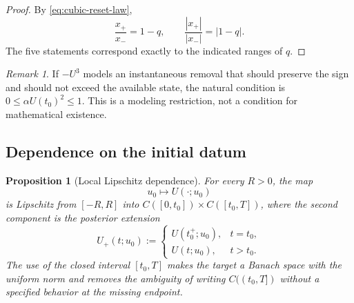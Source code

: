 \documentclass[preprint,12pt]{elsarticle}
\newenvironment{revision}{\begingroup\color{red}}{\endgroup}
\newenvironment{revision}{}{}
\newtheorem{proposition}[theorem]{Proposition}
\theoremstyle{definition}
\theoremstyle{remark}
\newtheorem{remark}[theorem]{Remark}
\begin{document}
\begin{proof}
By \eqref{eq:cubic-reset-law},
\[
 \frac{x_+}{x_-}=1-q,
 \qquad
 \frac{|x_+|}{|x_-|}=|1-q|.
\]
The five statements correspond exactly to the indicated ranges of $q$.
\end{proof}

\begin{remark}
If $-U^3$ models an instantaneous removal that should preserve the sign and should not exceed the available state, the natural condition is $0\le\alpha U(t_0)^2\le1$. This is a modeling restriction, not a condition for mathematical existence.
\end{remark}

\subsection{Dependence on the initial datum}

\begin{proposition}[Local Lipschitz dependence]\label{prop:continuous-dependence}
For every $R>0$, the map
\[
 u_0\longmapsto U(\cdot;u_0)
\]
\begin{revision}
is Lipschitz from \([-R,R]\) into
\(C([0,t_0])\times C([t_0,T])\), where the second component is the posterior
extension
\[
 U_+(t;u_0):=
 \begin{cases}
  U(t_0^+;u_0),&t=t_0,\\
  U(t;u_0),&t>t_0.
 \end{cases}
\]
The use of the closed interval \([t_0,T]\) makes the target a Banach space with
the uniform norm and removes the ambiguity of writing \(C((t_0,T])\) without a
specified behavior at the missing endpoint.
\end{revision}
\end{proposition}
\end{document}
